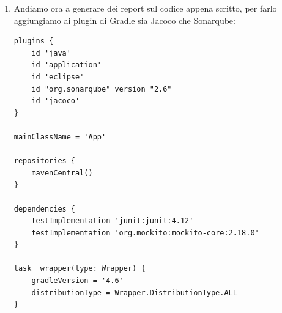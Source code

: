 \begin{enumerate}
\begin{lstlisting}[frame=single]
	@Test
	public void testGetAllStudentsWhenThereAreNoStudents() {
		assertGetAllStudent("");
	}

	@Test
	public void testGetAllStudents() {
		studentsList.add(newStudentTest("id0"));
		studentsList.add(newStudentTest("id1"));
		assertGetAllStudent(extractAllStudentsStringFromList(studentsList));
		verify(iStudentService, times(1)).getAllStudents();
	}

	@Test(expected = NullPointerException.class)
	public void testGetOneStudentWhenThereAreNoStudents() {
		assertNull(studentController.getOneStudent("id0"));
	}

	@Test
	public void testGetStudent() {
		Student student = new Student("id0");
		when(iStudentService.oneStudent("id0")).thenReturn(student);
		assertEquals(student.toString(), studentController.getOneStudent("id0"));
		verify(iStudentService, times(1)).oneStudent("id0");
	}

	private String extractAllStudentsStringFromList(List<Student> list) {
		return list.stream().map(student -> student.toString() + System.getProperty("line.separator"))
				.collect(Collectors.joining());
	}

	private void assertGetAllStudent(String expected) {
		assertEquals(expected, studentController.getAllStudents());
		verify(iStudentService, times(1)).getAllStudents();
	}

	private Student newStudentTest(String idStudent) {
		return new Student(idStudent);
	}

}
  \end{lstlisting}
  A partire da queste 2 classi di test è possibile ricavarsi l'implementazione del codice completo. A questo punto si ha un codice effettivo in cui Travis può eseguire la sua build precedentemente impostata.
  \item Andiamo ora a generare dei report sul codice appena scritto, per farlo aggiungiamo ai plugin di Gradle sia Jacoco che Sonarqube:
    \begin{lstlisting}[frame=single]
plugins {
    id 'java'
    id 'application'
    id 'eclipse'
  	id "org.sonarqube" version "2.6"
  	id 'jacoco'
}

mainClassName = 'App'

repositories {
    mavenCentral()
}

dependencies {
    testImplementation 'junit:junit:4.12'
    testImplementation 'org.mockito:mockito-core:2.18.0'
}

task  wrapper(type: Wrapper) {
    gradleVersion = '4.6'
    distributionType = Wrapper.DistributionType.ALL
}


\end{lstlisting}
\end{enumerate}
